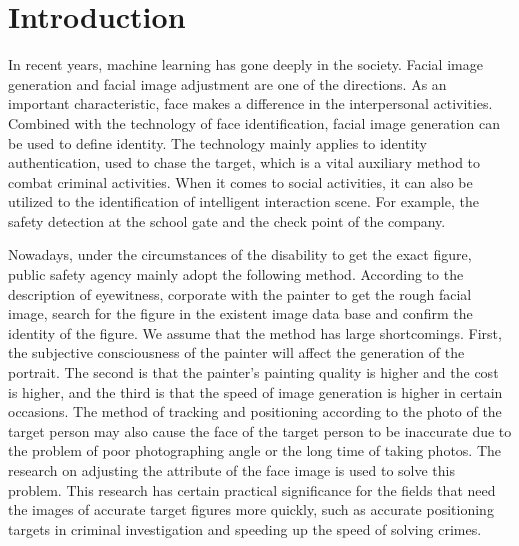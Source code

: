 \section{Introduction}

In recent years, machine learning has gone deeply in the society.
Facial image generation and facial image adjustment are one of the directions.
As an important characteristic, face makes a difference in the interpersonal activities.
Combined with the technology of face identification, facial image generation can be used to define identity.
The technology mainly applies to identity authentication, used to chase the target, which is a vital auxiliary method to combat criminal activities.
When it comes to social activities, it can also be utilized to the identification of intelligent interaction scene.
For example, the safety detection at the school gate and the check point of the company.

Nowadays, under the circumstances of the disability to get the exact figure,
    public safety agency mainly adopt the following method.
According to the description of eyewitness, corporate with the painter to get the rough facial image,
    search for the figure in the existent image data base and confirm the identity of the figure.
We assume that the method has large shortcomings.
First, the subjective consciousness of the painter will affect the generation of the portrait.
    The second is that the painter's painting quality is higher and the cost is higher,
    and the third is that the speed of image generation is higher in certain occasions.
The method of tracking and positioning according to the photo of the target person may also cause the face of the target person to be inaccurate due to the problem of poor photographing angle or the long time of taking photos.
The research on adjusting the attribute of the face image is used to solve this problem.
This research has certain practical significance for the fields that need the images of accurate target figures more quickly,
    such as accurate positioning targets in criminal investigation and speeding up the speed of solving crimes.